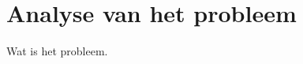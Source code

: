 \chapter{Analyse van het probleem}
\label{Analyse_van_het_probleem}

\begin{center}
   \begin{minipage}{0.5\textwidth}
      \begin{small}
         Wat is het probleem.
      \end{small} 
   \end{minipage}
   \vspace{0.5cm}
\end{center}



